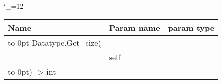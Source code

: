 \begingroup \catcode`\_=12 \tt
\begin{tabular}{lll}
\toprule
\textrm{Name}&\textrm{Param name}&\textrm{param type}\\
\midrule
\hbox to 0pt {Datatype.Get_size(\hss}\\
& self\\
\hbox to 0pt{) -> int\hss}\\
\bottomrule
\end{tabular}
\endgroup
